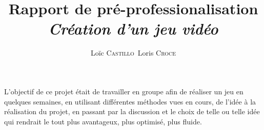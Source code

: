 \documentclass[a4paper]{report}
\author{Loïc \textsc{Castillo}\ Loris \textsc{Croce}}
\title{\textbf{Rapport de pré-professionalisation}\\ \emph{Création d'un jeu vidéo}}
\begin{document}
\maketitle{}
\tableofcontents

\abstract
{
    L'objectif de ce projet était de travailler en groupe afin de réaliser un jeu en quelques semaines, en utilisant différentes méthodes vues en cours, de l'idée à la réalisation du projet, en passant par la discussion et le choix de telle ou telle idée qui rendrait le tout plus avantageux, plus optimisé, plus fluide. 
}
\end{document}
